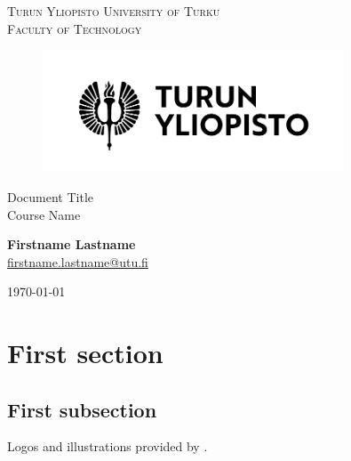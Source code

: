 \documentclass[12pt]{article}
\makeatletter
\newcommand{\faculty}{Faculty of Technology}
\newcommand{\course}{Course Name}
\newcommand{\documenttitle}{Document Title}
\newcommand{\authorname}{Firstname Lastname}
\newcommand{\authoremail}{firstname.lastname@utu.fi}
\newcommand{\documentdate}{\today}
\makeatother
\begin{document}
	\begin{titlepage}
		\begin{center}
			\textsc{Turun Yliopisto \textemdash \hspace{1mm} University of Turku} \\
			\textsc{\faculty}
		\end{center}
		\begin{figure}[h]
			\vspace{10mm}

			\centering\includegraphics[width=0.8\textwidth]{logo-fi.pdf}

			\vspace{20mm}
		\end{figure}
		\begin{center}
			\fontsize{10mm}{7mm}\selectfont
			\textup{\documenttitle} \\
			\textnormal{ \Large{\course}} \\

			\vspace{25mm}

			\large{\textbf{\authorname}} \\
			\large{\href{mailto:\authoremail}{\authoremail}} \\

			\vspace{35mm}

			\documentdate
		\end{center}
	\end{titlepage}

	\clearpage


	\tableofcontents

	\cleardoublepage


	\section{First section}

	\subsection{First subsection}

	Logos and illustrations provided by \citeauthor{UniversityOfTurku2022}.

	\clearpage


	\printbibliography[heading=bibintoc]
\end{document}
